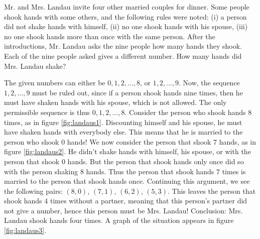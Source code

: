 \begin{exa}\label{exa:landaus}Mr. and Mrs. Landau invite four other married couples
for dinner. Some people shook hands with some others, and the
following rules were noted: (i) a person did not shake hands with
himself, (ii) no one shook hands with his spouse, (iii) no one
shook hands more than once with the same person. After the
introductions, Mr. Landau asks the nine people how many hands they
shook. Each of the nine people asked gives a different number. How
many hands did Mrs. Landau shake?
\begin{sol}
The given numbers can either be $0,1,2,\ldots , 8$, or
$1,2,\ldots , 9$. Now, the sequence $1,2,\ldots , 9$ must be ruled
out, since if a person shook hands nine times, then he must have
shaken hands with his spouse, which is not allowed. The only
permissible sequence is thus $0,1,2,\ldots , 8$. Consider the
person who shook hands $8$ times, as in figure \ref{fig:landaus1}.
Discounting himself and his spouse, he must have shaken hands with
everybody else. This means that he is married to the person who
shook $0$ hands! We now consider the person that shook $7$ hands,
as in figure \ref{fig:landaus2}. He didn't shake hands with
himself, his spouse, or with the person that shook $0$ hands. But
the person that shook hands only once did so with the person
shaking $8$ hands. Thus the person that shook hands $7$ times is
married to the person that shook hands once. Continuing this
argument, we see the following pairs: $(8,0)$, $(7,1)$, $(6,2)$,
$(5,3)$. This leaves the person that shook hands $4$ times without
a partner, meaning that this person's partner did not give a
number, hence this person must be Mrs. Landau! Conclusion: Mrs.
Landau shook hands four times. A graph of the situation appears in
figure \ref{fig:landaus3}. \vspace{1cm}
\end{sol}
\end{exa}
